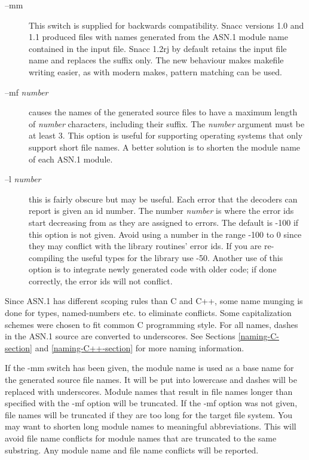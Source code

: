 \begin{description}
\item[--mm]
  This switch is supplied for backwards compatibility.
  Snacc versions 1.0 and 1.1 produced files with names generated from the ASN.1 module name contained in the input file.
  Snacc 1.2rj by default retains the input file name and replaces the suffix only.
  The new behaviour makes {\ufn makefile} writing easier, as with modern {\ufn make}s, pattern matching can be used.

\item[--mf \emph{number}]
  causes the names of the generated source files to have a maximum length of \emph{number} characters, including their suffix.
  The \emph{number} argument must be at least 3.
  This option is useful for supporting operating systems that only support short file names.
  A better solution is to shorten the module name of each ASN.1 module.

\item[--l \emph{number}]
  this is fairly obscure but may be useful.
  Each error that the decoders can report is given an id number.
  The number \emph{number} is where the error ids start decreasing from as they are assigned to errors.
  The default is -100 if this option is not given.
  Avoid using a number in the range -100 to 0 since they may conflict with the library routines' error ids.
  If you are re-compiling the useful types for the library use -50.
  Another use of this option is to integrate newly generated code with older code; if done correctly, the error ids will not conflict.

\end{description}

Since ASN.1 has different scoping rules than C and C++, some name munging
is done for types, named-numbers etc. to eliminate conflicts.
Some capitalization schemes were chosen to fit common C programming
style.  For all names, dashes in the ASN.1 source are converted to
underscores.  See Sections \ref{naming-C-section} and \ref{naming-C++-section}
for more naming information.

If the {\ufn -mm} switch has been given, the module name is used as a base name for the generated source file
names.  It will be put into lowercase and dashes will be replaced with
underscores.  Module names that result in file names longer than
specified with the {\ufn -mf} option will be truncated.  If the
{\ufn -mf} option was not given, file names will be truncated if they
are too long for the target file system. You may want to shorten long
module names to meaningful abbreviations. This will avoid file name
conflicts for module names that are truncated to the same substring.
Any module name and file name conflicts will be reported.

